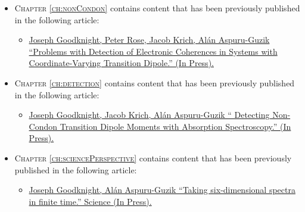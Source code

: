 \singlespacing

\noindent \begin{itemize} \setlength\itemsep{1em}

\item[] \textsc{Chapter \ref{ch:nonCondon}} contains content that has been previously published in the following article:
\begin{itemize}
\item \href{http://aspuru.chem.harvard.edu/publications/}{ Joseph Goodknight, Peter Rose, Jacob Krich, Al\'{a}n Aspuru-Guzik ``Problems with Detection of Electronic Coherences in Systems with Coordinate-Varying Transition Dipole.''  (In Press).}  %
\end{itemize}

\item[] \textsc{Chapter \ref{ch:detection}} contains content that has been previously published in the following article:
\begin{itemize}
\item \href{http://aspuru.chem.harvard.edu/publications/}{ Joseph Goodknight, Jacob Krich, Al\'{a}n Aspuru-Guzik `` Detecting Non-Condon Transition Dipole Moments with Absorption Spectroscopy.''  (In Press).}  %
\end{itemize}

\item[] \textsc{Chapter \ref{ch:sciencePerspective}} contains content that has been previously published in the following article:
\begin{itemize}
\item \href{http://www.sciencemag.org/?}{ Joseph Goodknight, Al\'{a}n Aspuru-Guzik ``Taking six-dimensional spectra in finite time.'' \mbox{Science} (In Press).}  %
\end{itemize}

\end{itemize}

\doublespacing
